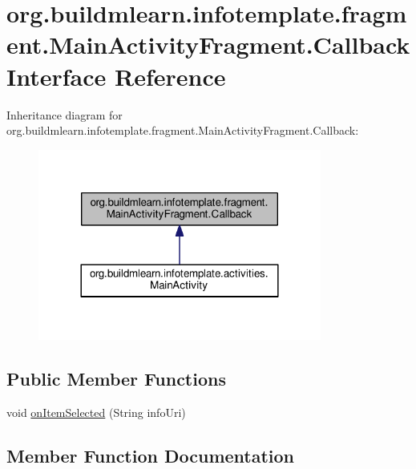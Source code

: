 \hypertarget{interfaceorg_1_1buildmlearn_1_1infotemplate_1_1fragment_1_1MainActivityFragment_1_1Callback}{}\section{org.\+buildmlearn.\+infotemplate.\+fragment.\+Main\+Activity\+Fragment.\+Callback Interface Reference}
\label{interfaceorg_1_1buildmlearn_1_1infotemplate_1_1fragment_1_1MainActivityFragment_1_1Callback}


Inheritance diagram for org.\+buildmlearn.\+infotemplate.\+fragment.\+Main\+Activity\+Fragment.\+Callback\+:
\nopagebreak
\begin{figure}[H]
\begin{center}
\leavevmode
\includegraphics[width=264pt]{interfaceorg_1_1buildmlearn_1_1infotemplate_1_1fragment_1_1MainActivityFragment_1_1Callback__inherit__graph}
\end{center}
\end{figure}
\subsection*{Public Member Functions}
\begin{DoxyCompactItemize}
\item 
void \hyperlink{interfaceorg_1_1buildmlearn_1_1infotemplate_1_1fragment_1_1MainActivityFragment_1_1Callback_a3c978407457b21790ff11b070a72b43b}{on\+Item\+Selected} (String info\+Uri)
\end{DoxyCompactItemize}


\subsection{Member Function Documentation}

